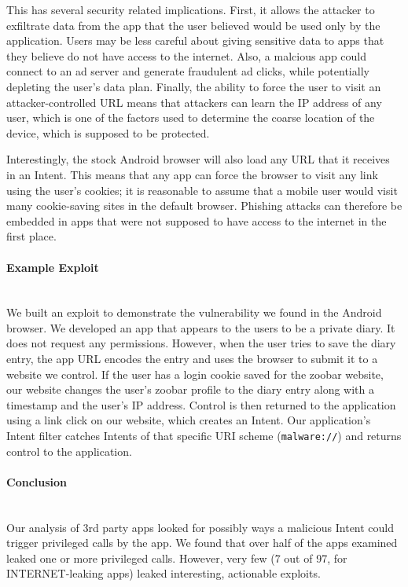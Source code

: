 \documentclass[12pt,a4paper]{article}
\begin{document}
This has several security related implications. First, it allows the attacker to
exfiltrate data from the app that the user believed would be used only by the
application. Users may be less careful about giving sensitive data to apps that
they believe do not have access to the internet.  Also, a malcious app could
connect to an ad server and generate fraudulent ad clicks, while potentially
depleting the user's data plan.  Finally, the ability to force the user to visit
an attacker-controlled URL means that attackers can learn the IP address of any
user, which is one of the factors used to determine the coarse location of the
device, which is supposed to be protected.

Interestingly, the stock Android browser will also load any URL that it receives
in an Intent. This means that any app can force the browser to visit any link
using the user's cookies; it is reasonable to assume that a mobile user would
visit many cookie-saving sites in the default browser. Phishing attacks can
therefore be embedded in apps that were not supposed to have access to the
internet in the first place.

\paragraph{Example Exploit} ~\\
We built an exploit to demonstrate the vulnerability we found in the Android
browser. We developed an app that appears to the users to be a private diary. It
does not request any permissions. However, when the user tries to save the diary
entry, the app URL encodes the entry and uses the browser to submit it to a
website we control. If the user has a login cookie saved for the zoobar website,
our website changes the user's zoobar profile to the diary entry along with a
timestamp and the user's IP address. Control is then returned to the application
using a link click on our website, which creates an Intent. Our application's
Intent filter catches Intents of that specific URI scheme (\texttt{malware://})
and returns control to the application.

\paragraph{Conclusion} ~\\
Our analysis of 3rd party apps looked for possibly ways a malicious Intent could
trigger privileged calls by the app. We found that over half of the apps
examined leaked one or more privileged calls. However, very few (7 out of 97,
for INTERNET-leaking apps) leaked interesting, actionable exploits.
\end{document}
